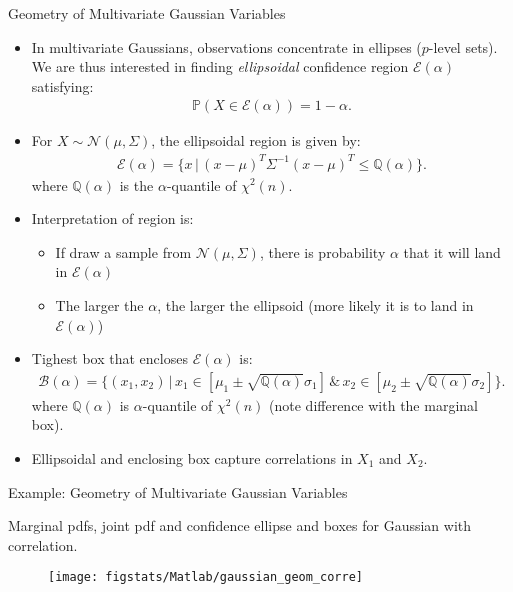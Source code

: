\documentclass[9pt]{beamer}
\begin{document}
%
\begin{frame}{Geometry of Multivariate Gaussian Variables}

\begin{itemize}
\item  In multivariate Gaussians, observations concentrate in ellipses ($p$-level sets). We are thus interested in finding {\em ellipsoidal} confidence region $\mathcal{E}(\alpha)$ satisfying:
\begin{align*}
\mathbb{P}(X\in \mathcal{E}(\alpha))=1-\alpha.
\end{align*}
\item For $X\sim \mathcal{N}(\mu,\Sigma)$, the ellipsoidal region is given by:
\begin{align*}
\mathcal{E}(\alpha)=\{x\,|\,(x-\mu)^T\Sigma^{-1}(x-\mu)^T\leq \mathbb{Q}(\alpha)\}.
\end{align*}
where $\mathbb{Q}(\alpha)$ is the $\alpha$-quantile of $\chi^2(n)$.  
\item  Interpretation of region is:
\begin{itemize}
\item If draw a sample from $\mathcal{N}(\mu,\Sigma)$, there is probability $\alpha$ that it will land in $\mathcal{E}(\alpha)$
\item The larger the $\alpha$, the larger the ellipsoid (more likely it is to land in $\mathcal{E}(\alpha)$)
\end{itemize}
\item Tighest box that encloses $\mathcal{E}(\alpha)$ is:
\begin{align*}
\mathcal{B}(\alpha)=\{(x_1,x_2)\,|\,x_1\in [\mu_1\pm \sqrt{\mathbb{Q}(\alpha)}\sigma_1]\,\&\,x_2\in [\mu_2\pm \sqrt{\mathbb{Q}(\alpha)}\sigma_2]\}.
\end{align*}
where $\mathbb{Q}(\alpha)$ is  $\alpha$-quantile of $\chi^2(n)$ (note difference with the marginal box). 
\item Ellipsoidal and enclosing box capture correlations in $X_1$ and $X_2$.
\end{itemize}

\end{frame}

%
\begin{frame}{Example: Geometry of Multivariate Gaussian Variables}

Marginal pdfs, joint pdf and confidence ellipse and boxes for Gaussian with correlation. 
\begin{figure}[!htb]
    \centering
	\texttt{[image: figstats/Matlab/gaussian\_geom\_corre]}
\end{figure}

\end{frame}
\end{document}

